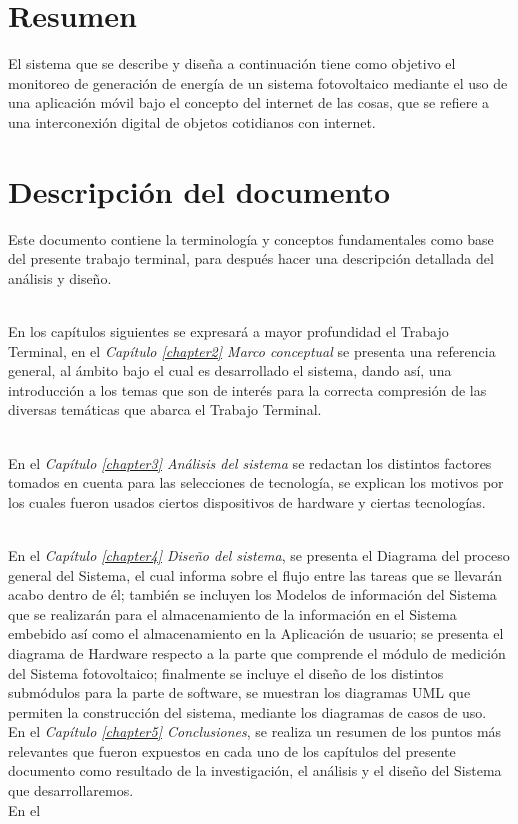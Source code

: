 \section{Resumen}
El sistema que se describe y diseña a continuación tiene como objetivo el monitoreo de generación de energía de un sistema fotovoltaico mediante el uso de una aplicación móvil bajo el concepto del internet de las cosas, que se refiere a una interconexión digital de objetos cotidianos con internet.

\section{Descripción del documento}
Este documento contiene la terminología y conceptos fundamentales como base del presente trabajo terminal, para después hacer una descripción detallada del análisis y diseño. 

\\
En los capítulos siguientes se expresará a mayor profundidad el Trabajo Terminal, en el \textit{Capítulo \ref{chapter2} Marco conceptual} se presenta una referencia general, al ámbito bajo el cual es desarrollado el sistema, dando así, una introducción a los temas que son de interés para la correcta compresión de las diversas temáticas que abarca el Trabajo Terminal.

\\
En el \textit{Capítulo \ref{chapter3} Análisis del sistema} se redactan los distintos factores tomados en cuenta para las selecciones de tecnología, se explican los motivos por los cuales fueron usados ciertos dispositivos de hardware y ciertas tecnologías.

\\
En el \textit{Capítulo \ref{chapter4} Diseño del sistema}, se presenta el Diagrama del proceso general del Sistema, el cual informa sobre el flujo entre las tareas que se llevarán acabo dentro de él; también se incluyen los Modelos de información del Sistema que se realizarán para el almacenamiento de la información en el Sistema embebido así como el almacenamiento en la Aplicación de usuario; se presenta el diagrama de Hardware respecto a la parte que comprende el módulo de medición del Sistema fotovoltaico; finalmente se incluye el diseño de los distintos submódulos para la parte de software, se muestran los diagramas UML que permiten la construcción del sistema, mediante los diagramas de casos de uso.
\\
En el \textit{Capítulo \ref{chapter5} Conclusiones}, 
se realiza un resumen de los puntos más relevantes que fueron expuestos en cada uno de los capítulos del presente documento como resultado de la investigación, el análisis y el diseño del Sistema que desarrollaremos.   
\\
En el 


